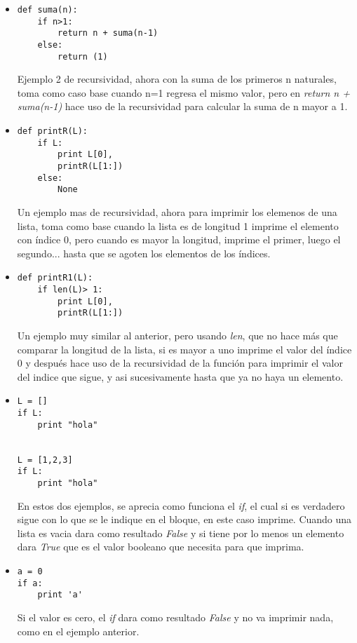 \documentclass{book}
\begin{document}
\begin{enumerate}
\begin{itemize}
		
		\item \begin{lstlisting}
def suma(n):
    if n>1:
        return n + suma(n-1)
    else:
        return (1)
		\end{lstlisting} Ejemplo 2 de recursividad, ahora con la suma de los primeros n naturales, toma como caso base cuando n=1 regresa el mismo valor, pero en \textit{return n + suma(n-1)} hace uso de la recursividad para calcular la suma de n mayor a 1.\\
		
		\item \begin{lstlisting}
def printR(L):
    if L:
        print L[0],
        printR(L[1:])
    else:
        None
		\end{lstlisting} Un ejemplo mas de recursividad, ahora para imprimir los elemenos de una lista, toma como base cuando la lista es de longitud 1 imprime el elemento con índice 0, pero cuando es mayor la longitud, imprime el primer, luego el segundo... hasta que se agoten los elementos de los índices.\\
		
		
		\item \begin{lstlisting}
def printR1(L):
    if len(L)> 1:
        print L[0],
        printR(L[1:])
		\end{lstlisting} Un ejemplo muy similar al anterior, pero usando \textit{len}, que no hace más que comparar la longitud de la lista, si es mayor a uno imprime el valor del índice 0 y después hace uso de la recursividad de la función para imprimir el valor del indice que sigue, y asi sucesivamente hasta que ya no haya un elemento.\\
		
		
		\item \begin{lstlisting}
L = []
if L:
    print "hola"
		
		
L = [1,2,3]
if L:
    print "hola"   
		\end{lstlisting} En estos dos ejemplos, se aprecia como funciona el \textit{if}, el cual si es verdadero sigue con lo que se le indique en el bloque, en este caso imprime. Cuando una lista es vacia dara como resultado \textit{False} y si tiene por lo menos un elemento dara \textit{True} que es el valor booleano que necesita para que imprima.\\
		\item \begin{lstlisting}
a = 0 
if a: 
    print 'a'
		\end{lstlisting} Si el valor es cero, el \textit{if} dara como resultado \textit{False} y no va imprimir nada, como en el ejemplo anterior. 
		
		
		
	\end{itemize}
	
	
	
	
	
	
	
\end{enumerate}
\end{document}
